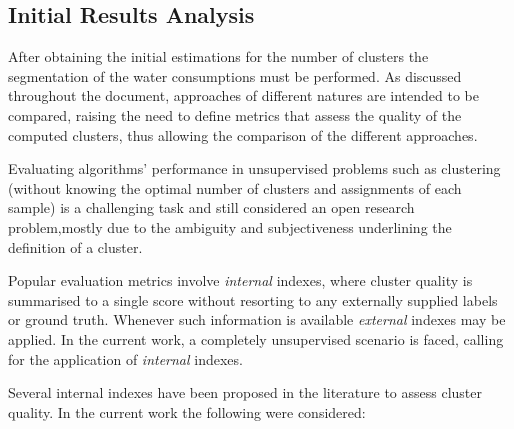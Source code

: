 \documentclass[9pt,journal,compsoc]{IEEEtran}
\begin{document}
\subsection{Initial Results Analysis}

After obtaining the initial estimations for the number of clusters the segmentation of the water consumptions must be performed. As discussed throughout the document, approaches of different natures are intended to be compared, raising the need to define metrics that assess the quality of the computed clusters, thus allowing the comparison of the different approaches.

Evaluating algorithms' performance in unsupervised problems such as clustering (without knowing the optimal number of clusters and assignments of each sample) is a challenging task and still considered an open research problem\cite{aghabozorgi2015time},mostly due to the ambiguity and subjectiveness underlining the definition of a cluster.

Popular evaluation metrics involve \emph{internal} indexes, where cluster quality is summarised to a single score without resorting to any externally supplied labels or ground truth. Whenever such information is available \emph{external} indexes may be applied. In the current work, a completely unsupervised scenario is faced, calling for the application of \emph{internal} indexes.

Several internal indexes have been proposed in the literature to assess cluster quality. In the current work the following were considered:
\end{document}
